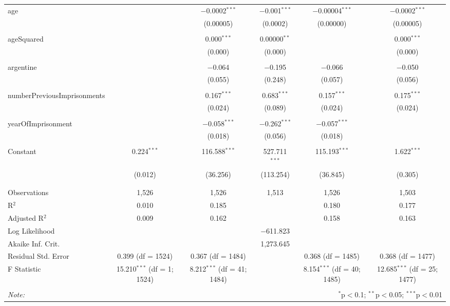 \documentclass[a4paper,12pt]{article}
\begin{document}
\begin{table}[!htbp]
{\begin{tabular}{@{\extracolsep{5pt}}lccccc}
 age &  & $-$0.0002$^{***}$ & $-$0.001$^{***}$ & $-$0.00004$^{***}$ & $-$0.0002$^{***}$ \\ 
  &  & (0.00005) & (0.0002) & (0.00000) & (0.00005) \\ 
  & & & & & \\ 
 ageSquared &  & 0.000$^{***}$ & 0.00000$^{**}$ &  & 0.000$^{***}$ \\ 
  &  & (0.000) & (0.000) &  & (0.000) \\ 
  & & & & & \\ 
 argentine &  & $-$0.064 & $-$0.195 & $-$0.066 & $-$0.050 \\ 
  &  & (0.055) & (0.248) & (0.057) & (0.056) \\ 
  & & & & & \\ 
 numberPreviousImprisonments &  & 0.167$^{***}$ & 0.683$^{***}$ & 0.157$^{***}$ & 0.175$^{***}$ \\ 
  &  & (0.024) & (0.089) & (0.024) & (0.024) \\ 
  & & & & & \\ 
 yearOfImprisonment &  & $-$0.058$^{***}$ & $-$0.262$^{***}$ & $-$0.057$^{***}$ &  \\ 
  &  & (0.018) & (0.056) & (0.018) &  \\ 
  & & & & & \\ 

 Constant & 0.224$^{***}$ & 116.588$^{***}$ & 527.711$^{***}$ & 115.193$^{***}$ & 1.622$^{***}$ \\ 
  & (0.012) & (36.256) & (113.254) & (36.845) & (0.305) \\ 
  & & & & & \\ 
\hline \\[-1.8ex] 
Observations & 1,526 & 1,526 & 1,513 & 1,526 & 1,503 \\ 
R$^{2}$ & 0.010 & 0.185 &  & 0.180 & 0.177 \\ 
Adjusted R$^{2}$ & 0.009 & 0.162 &  & 0.158 & 0.163 \\ 
Log Likelihood &  &  & $-$611.823 &  &  \\ 
Akaike Inf. Crit. &  &  & 1,273.645 &  &  \\ 
Residual Std. Error & 0.399 (df = 1524) & 0.367 (df = 1484) &  & 0.368 (df = 1485) & 0.368 (df = 1477) \\ 
F Statistic & 15.210$^{***}$ (df = 1; 1524) & 8.212$^{***}$ (df = 41; 1484) &  & 8.154$^{***}$ (df = 40; 1485) & 12.685$^{***}$ (df = 25; 1477) \\ 
\hline 
\hline \\[-1.8ex] 
\textit{Note:}  & \multicolumn{5}{r}{$^{*}$p$<$0.1; $^{**}$p$<$0.05; $^{***}$p$<$0.01} \\ 
\end{tabular} }
\end{table} 
\end{document}
